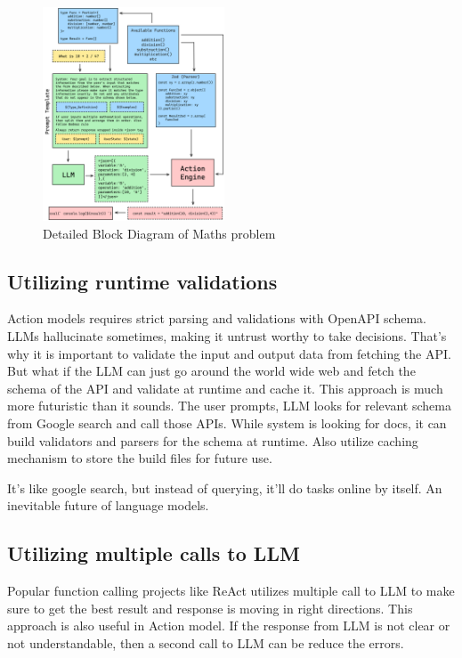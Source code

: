 \documentclass[conference]{IEEEtran}
\begin{document}
\begin{figure}[htbp]
    \centering
    \includegraphics[width=0.48\textwidth]{images/program.png}
    \caption{Detailed Block Diagram of Maths problem}
    \label{fig}
\end{figure}

\subsection{Utilizing runtime validations}
Action models requires strict parsing and validations with OpenAPI schema. LLMs
hallucinate sometimes, making it untrust worthy to take decisions. That's why
it is important to validate the input and output data from fetching the API.
But what if the LLM can just go around the world wide web and fetch the schema
of the API and validate at runtime and cache it. This approach is much more
futuristic than it sounds. The user prompts, LLM looks for relevant schema from
Google search and call those APIs. While system is looking for docs, it can
build validators and parsers for the schema at runtime. Also utilize caching
mechanism to store the build files for future use.

It's like google search, but instead of querying, it'll do tasks online by
itself. An inevitable future of language models.

\subsection{Utilizing multiple calls to LLM}
Popular function calling projects like ReAct utilizes multiple call to LLM to
make sure to get the best result and response is moving in right directions.
This approach is also useful in Action model. If the response from LLM is not
clear or not understandable, then a second call to LLM can be reduce the
errors.
\end{document}
